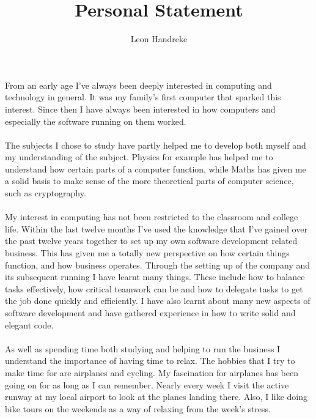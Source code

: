 \documentclass[11pt]{article}
\title{Personal Statement}
\author{Leon Handreke}
\date{}                                           %
\begin{document}
\doublespacing

\maketitle
{}\selectfont

\paragraph{}
From an early age I've always been deeply interested in computing and technology in general. It was my family's first computer that sparked this interest. Since then I have always been interested in how computers and especially the software running on them worked.
\paragraph{}
The subjects I chose to study have partly helped me to develop both myself and my understanding of the subject. Physics for example has helped me to understand how certain parts of a computer function, while Maths has given me a solid basis to make sense of the more theoretical parts of computer science, such as cryptography.
\paragraph{}
My interest in computing has not been restricted to the classroom and college life. Within the last twelve months I've used the knowledge that I've gained over the past twelve years together to set up my own software development related business. This has given me a totally new perspective on how certain things function, and how business operates. Through the setting up of the company and its subsequent running I have learnt many things. These include how to balance tasks effectively, how critical teamwork can be and how to delegate tasks to get the job done quickly and efficiently. I have also learnt about many new aspects of software development and have gathered experience in how to write solid and elegant code.
\paragraph{}
As well as spending time both studying and helping to run the business I understand the importance of having time to relax. The hobbies that I try to make time for are airplanes and cycling. My fascination for airplanes has been going on for as long as I can remember. Nearly every week I visit the active runway at my local airport to look at the planes landing there. Also, I like doing bike tours on the weekends as a way of relaxing from the week's stress.
\end{document}
